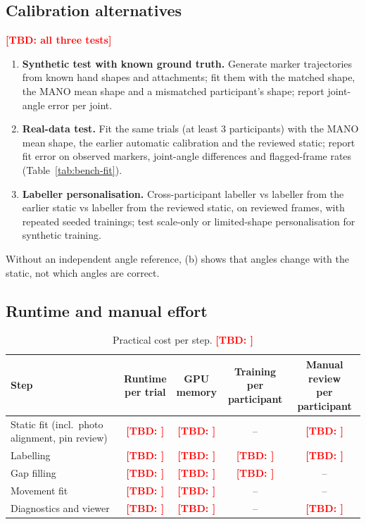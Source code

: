 \documentclass[11pt,a4paper]{article}
\newcommand{\tbd}[1]{\textcolor{red}{\textbf{[TBD: #1]}}}
\begin{document}
\subsection{Calibration alternatives}\label{sec:val-calib}
\tbd{all three tests}
\begin{enumerate}[label=(\alph*),nosep]
  \item \textbf{Synthetic test with known ground truth.} Generate marker trajectories from known hand shapes and
  attachments; fit them with the matched shape, the MANO mean shape and a mismatched participant's shape; report
  joint-angle error per joint.
  \item \textbf{Real-data test.} Fit the same trials (at least 3 participants) with the MANO mean shape, the earlier
  automatic calibration and the reviewed static; report fit error on observed markers, joint-angle differences and
  flagged-frame rates (Table~\ref{tab:bench-fit}).
  \item \textbf{Labeller personalisation.} Cross-participant labeller vs labeller from the earlier static vs labeller from the
  reviewed static, on reviewed frames, with repeated seeded trainings; test scale-only or limited-shape
  personalisation for synthetic training.
\end{enumerate}
Without an independent angle reference, (b) shows that angles change with the static, not which angles are correct.

\subsection{Runtime and manual effort}
\begin{table}[h]\centering\small
\caption{Practical cost per step. \tbd{}}\label{tab:bench-cost}
\begin{tabular}{lcccc}\toprule
Step & \shortstack{Runtime\\per trial} & \shortstack{GPU\\memory} & \shortstack{Training per\\participant} & \shortstack{Manual review\\per participant} \\\midrule
Static fit (incl.\ photo alignment, pin review) & \tbd{} & \tbd{} & -- & \tbd{} \\
Labelling & \tbd{} & \tbd{} & \tbd{} & \tbd{} \\
Gap filling & \tbd{} & \tbd{} & \tbd{} & -- \\
Movement fit & \tbd{} & \tbd{} & -- & -- \\
Diagnostics and viewer & \tbd{} & \tbd{} & -- & \tbd{} \\\bottomrule
\end{tabular}
\end{table}
\end{document}

